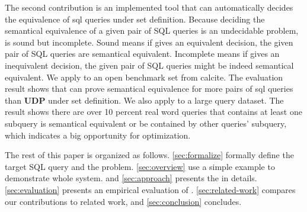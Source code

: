 The second contribution is an implemented tool \sys that can automatically decides the equivalence of sql queries under set definition.
%
Because deciding the semantical equivalence of a given pair of SQL queries is an undecidable problem, \sys is sound but incomplete.
%
Sound means if \sys gives an equivalent decision, the given pair of SQL queries are semantical equivalent.
%
Incomplete means if \sys gives an inequivalent decision, the given pair of SQL queries might be indeed semantical equivalent.
%
We apply \sys to an open benchmark set from calcite.
%
The evaluation result shows that \sys can prove semantical equivalence for more pairs of sql queries than \textbf{UDP} under set definition.
%
We also apply \sys to a large query dataset.
%
The result shows there are over 10 percent real word queries that contains at least one subquery is semantical equivalent or be contained by other queries'
subquery, which indicates a big opportunity for optimization.

The rest of this paper is organized as follows.
\autoref{sec:formalize} formally define the target SQL query and the problem.
%
\autoref{sec:overview} use a simple example to demonstrate whole system.
%
and \autoref{sec:approach} presents the \sys in details.
%
\autoref{sec:evaluation} presents an empirical evaluation of \sys.
%
\autoref{sec:related-work} compares our contributions to related work,
and
%
\autoref{sec:conclusion} concludes.

